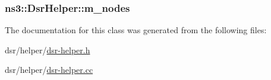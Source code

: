 \subsubsection[{\texorpdfstring{m\+\_\+nodes}{m_nodes}}]{ ns3\+::\+Dsr\+Helper\+::m\+\_\+nodes\hspace{0.3cm}{\ttfamily [private]}}\hypertarget{classns3_1_1DsrHelper_a571da43c1ae96454b6cbfbf5054319b2}{}\label{classns3_1_1DsrHelper_a571da43c1ae96454b6cbfbf5054319b2}


The documentation for this class was generated from the following files\+:\begin{DoxyCompactItemize}
\item 
dsr/helper/\hyperlink{dsr-helper_8h}{dsr-\/helper.\+h}\item 
dsr/helper/\hyperlink{dsr-helper_8cc}{dsr-\/helper.\+cc}\end{DoxyCompactItemize}
